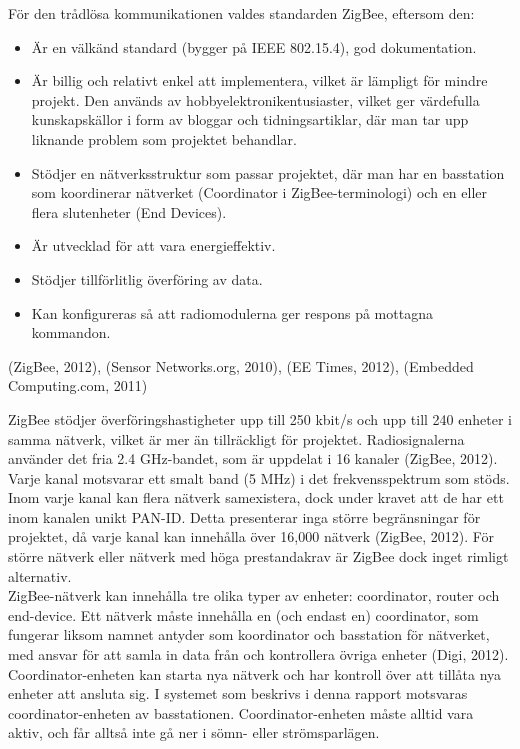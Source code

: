 \documentclass[a4paper,11pt]{article}
\begin{document}
För den trådlösa kommunikationen valdes standarden ZigBee, eftersom den:
	
	\begin{itemize}
    	\item Är en välkänd standard (bygger på IEEE 802.15.4), god dokumentation.
    	\item Är billig och relativt enkel att implementera, vilket är lämpligt för mindre projekt. Den används av hobbyelektronikentusiaster, vilket ger värdefulla kunskapskällor i form av bloggar och tidningsartiklar, där man tar upp liknande problem som projektet behandlar.
    	\item Stödjer en nätverksstruktur som passar projektet, där man har en basstation som koordinerar nätverket (Coordinator i ZigBee-terminologi) och en eller flera slutenheter (End Devices).
    	\item Är utvecklad för att vara energieffektiv.
    	\item Stödjer tillförlitlig överföring av data.
    	\item Kan konfigureras så att radiomodulerna ger respons på mottagna kommandon.
    	\end{itemize}
(ZigBee, 2012), (Sensor Networks.org, 2010), (EE Times, 2012), (Embedded Computing.com, 2011)
    	
ZigBee stödjer överföringshastigheter upp till 250 kbit/s och upp till 240 enheter i samma nätverk, vilket är mer än tillräckligt för projektet. Radiosignalerna använder det fria 2.4 GHz-bandet, som är uppdelat i 16 kanaler (ZigBee, 2012). Varje kanal motsvarar ett smalt band (5 MHz) i det frekvensspektrum som stöds. Inom varje kanal kan flera nätverk samexistera, dock under kravet att de har ett inom kanalen unikt PAN-ID. Detta presenterar inga större begränsningar för projektet, då varje kanal kan innehålla över 16,000 nätverk (ZigBee, 2012). För större nätverk eller nätverk med höga prestandakrav är ZigBee dock inget rimligt alternativ. \\

ZigBee-nätverk kan innehålla tre olika typer av enheter: coordinator, router och end-device. Ett nätverk måste innehålla en (och endast en) coordinator, som fungerar liksom namnet antyder som koordinator och basstation för nätverket, med ansvar för att samla in data från och kontrollera övriga enheter (Digi, 2012). Coordinator-enheten kan starta nya nätverk och har kontroll över att tillåta nya enheter att ansluta sig. I systemet som beskrivs i denna rapport motsvaras coordinator-enheten av basstationen. Coordinator-enheten måste alltid vara aktiv, och får alltså inte gå ner i sömn- eller strömsparlägen. \\
\end{document}
